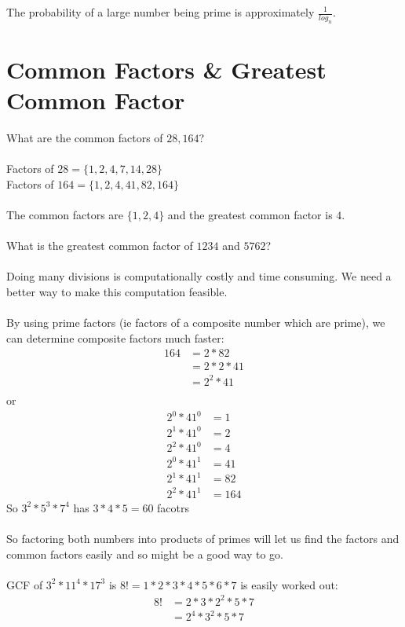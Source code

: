 The probability of a large number being prime is approximately $\frac{1}{log_n}$.

\section{Common Factors \& Greatest Common Factor}
What are the common factors of $28, 164$? \\
\\
Factors of $28 = \{ 1,2,4,7,14,28 \}$ \\
Factors of $164 = \{1, 2, 4, 41, 82, 164 \}$ \\
\\
The common factors are $\{1,2,4\}$ and the greatest common factor is $4$. \\
\\
What is the greatest common factor of $1234$ and $5762$?\\
\\
Doing many divisions is computationally costly and time consuming. We need a
better way to make this computation feasible.\\
\\
By using prime factors (ie factors of a composite number which are prime), we
can determine composite factors much faster:
\begin{align}
  164 & = 2 * 82 \\
      & = 2*2*41 \\
      & = 2^2 * 41 \\
\end{align} 
or
\begin{align}
  2^0 * 41^0 & = 1 \\
  2^1 * 41^0 & = 2 \\
  2^2 * 41^0 & = 4 \\
  2^0 * 41^1 & = 41 \\
  2^1 * 41^1 & = 82 \\
  2^2 * 41^1 & = 164
\end{align}
So $3^2 * 5^3 * 7^4$ has $3*4*5 = 60$ facotrs\\
\\
So factoring both numbers into products of primes will let us find the factors
and common factors easily and so might be a good way to go.\\
\\
GCF of $3^2 * 11^4 * 17^3$ is $8! = 1*2*3*4*5*6*7$ is easily worked out:
\begin{align}
  8! & = 2* 3 * 2^2 * 5 * 7 \\
     & = 2^4 * 3^2 * 5 * 7
\end{align}
